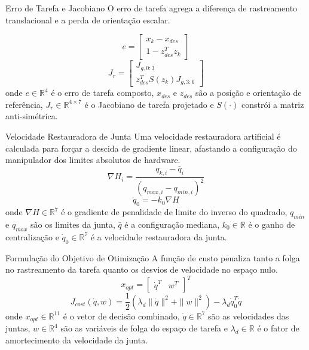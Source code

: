 \documentclass[aspectratio=169]{beamer}
\begin{document}
\begin{frame}{Erro de Tarefa e Jacobiano}
O erro de tarefa agrega a diferença de rastreamento translacional e a perda de orientação escalar.

\begin{equation}
    e = \begin{bmatrix} x_k - x_{des} \\ 1 - z_{des}^T z_k \end{bmatrix}
\end{equation}
\begin{equation}
    J_{r} = \begin{bmatrix} J_{g, 0:3} \\ z_{des}^T S(z_k) J_{g, 3:6} \end{bmatrix}
\end{equation}
onde $e \in \mathbb{R}^4$ é o erro de tarefa composto, $x_{des}$ e $z_{des}$ são a posição e orientação de referência, $J_r \in \mathbb{R}^{4 \times 7}$ é o Jacobiano de tarefa projetado e $S(\cdot)$ constrói a matriz anti-simétrica.
\end{frame}

\begin{frame}{Velocidade Restauradora de Junta}
Uma velocidade restauradora artificial é calculada para forçar a descida de gradiente linear, afastando a configuração do manipulador dos limites absolutos de hardware.
\begin{equation}
    \nabla H_i = \frac{q_{k,i} - \bar{q}_i}{(q_{max, i} - q_{min, i})^2}
\end{equation}
\begin{equation}
    \dot{q}_0 = -k_0 \nabla H
\end{equation}
onde $\nabla H \in \mathbb{R}^7$ é o gradiente de penalidade de limite do inverso do quadrado, $q_{min}$ e $q_{max}$ são os limites da junta, $\bar{q}$ é a configuração mediana, $k_0 \in \mathbb{R}$ é o ganho de centralização e $\dot{q}_0 \in \mathbb{R}^7$ é a velocidade restauradora da junta.
\end{frame}

\begin{frame}{Formulação do Objetivo de Otimização}
A função de custo penaliza tanto a folga no rastreamento da tarefa quanto os desvios de velocidade no espaço nulo.
\begin{equation}
    x_{opt} = \begin{bmatrix} \dot{q}^T & w^T \end{bmatrix}^T
\end{equation}
\begin{equation}
    J_{cost}(\dot{q}, w) = \frac{1}{2} \left( \lambda_d \|\dot{q}\|^2 + \|w\|^2 \right) - \lambda_d \dot{q}_0^T \dot{q}
\end{equation}
onde $x_{opt} \in \mathbb{R}^{11}$ é o vetor de decisão combinado, $\dot{q} \in \mathbb{R}^7$ são as velocidades das juntas, $w \in \mathbb{R}^4$ são as variáveis de folga do espaço de tarefa e $\lambda_d \in \mathbb{R}$ é o fator de amortecimento da velocidade da junta.
\end{frame}
\end{document}
